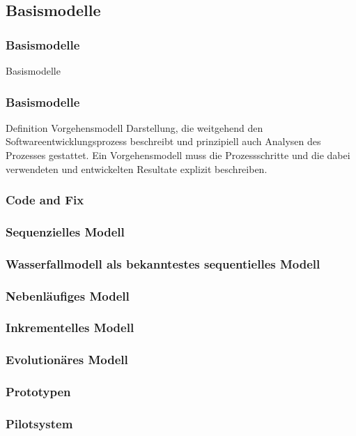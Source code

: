 \subsection{Basismodelle}
\begin{frame}
\frametitle{Basismodelle}
\huge Basismodelle
\end{frame}

\begin{frame}
\frametitle{Basismodelle}
	\begin{block}{Definition Vorgehensmodell}
		Darstellung, die weitgehend den Softwareentwicklungsprozess beschreibt und prinzipiell 
		auch Analysen des Prozesses gestattet.
		Ein Vorgehensmodell muss die Prozessschritte und die dabei verwendeten und entwickelten 
		Resultate explizit beschreiben.
	\end{block}
\end{frame}

\begin{frame}
\frametitle{Code and Fix}
	
\end{frame}

\begin{frame}
\frametitle{Sequenzielles Modell}
	
\end{frame}

\begin{frame}
\frametitle{Wasserfallmodell als bekanntestes sequentielles Modell}
	
\end{frame}

\begin{frame}
\frametitle{Nebenläufiges Modell}
	
\end{frame}

\begin{frame}
\frametitle{Inkrementelles Modell}
	
\end{frame}

\begin{frame}
\frametitle{Evolutionäres Modell}
	
\end{frame}

\begin{frame}
\frametitle{Prototypen}
	
\end{frame}

\begin{frame}
\frametitle{Pilotsystem}
	
\end{frame}

